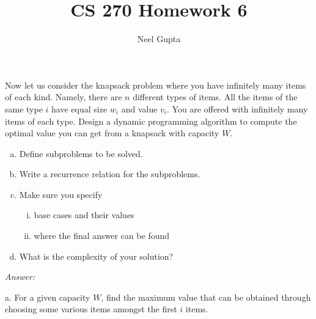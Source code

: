 \documentclass[12pt]{article}
\newenvironment{problem}[2][Problem]{\begin{trivlist}
\item[\hskip \labelsep {\bfseries #1}\hskip \labelsep {\bfseries #2.}]}{\end{trivlist}}
\begin{document}

\title{\vspace{-4cm}CS 270 Homework 6}
\author{Neel Gupta} 
\maketitle

\begin{problem}{1}
    Now let us consider the knapsack problem where you have infinitely many items of each kind. Namely, there are $n$ different types of items. All the items of the same type $i$ have equal size $w_i$ and value $v_i$. You are offered with infinitely many items of each type. Design a dynamic programming algorithm to compute the optimal value you can get from a knapsack with capacity $W$.
    \begin{enumerate}[a.]
        \item Define subproblems to be solved.
        \item Write a recurrence relation for the subproblems.
        \item Make sure you specify
        \begin{enumerate}[i.]
            \item base cases and their values
            \item where the final answer can be found
        \end{enumerate}
        \item What is the complexity of your solution?
    \end{enumerate}
\end{problem}
\textit{Answer:}

a. For a given capacity $W$, find the maximum value that can be obtained through choosing some various items amongst the first $i$ items.
\end{document}
